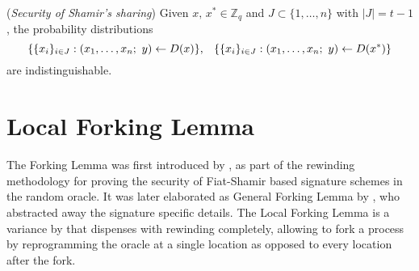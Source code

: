 \documentclass{iacrtrans}
\begin{document}

\begin{rem}\label{shamir_security}
(\textit{Security of Shamir's sharing})
Given $x,\hspace{2pt} x^* \in \mathbb{Z}_q$ and
$J \subset \{1, \dots, n\}$ with $|J| = t - 1$,
the probability distributions
\vspace{5pt}
\begin{equation*}
\{\{x_i\}_{i \in J}:
(x_1, \dots, x_n;\ y) \leftarrow D(x)\},
\hspace{8pt}
\{\{x_i\}_{i \in J}:
(x_1, \dots, x_n;\ y) \leftarrow D(x^*)\}
\vspace{5pt}
\end{equation*}
are indistinguishable.
\end{rem}

\section{Local Forking Lemma}\label{section_local_forking_lemma}

\noindent
The Forking Lemma was first introduced by
\cite{paper_pointcheval_stern_1}, \cite{paper_pointcheval_stern_2}
as part of the rewinding methodology for proving
the security of Fiat-Shamir based signature schemes
in the random oracle. It was later elaborated as
General Forking Lemma by \cite{paper_bellare_musig}, who
abstracted away the signature specific details.
The Local Forking Lemma is a variance
by \cite{paper_bellare_local_forking}
that dispenses with rewinding completely,
allowing to fork a process
by reprogramming the oracle at a single location
as opposed to every location after the fork.
\end{document}
